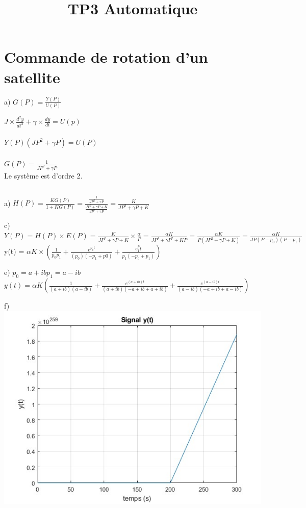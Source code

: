 \documentclass[15pt]{article}
\title{TP3 Automatique}
\begin{document}
\maketitle

\begin{abstract}
\end{abstract}

\section{Commande de rotation d'un satellite}

a) $G(P) = \frac{Y(P)}{U(P)} $

$J\times \frac{d^2y}{dt^2} + \gamma \times \frac{dy}{dt} =U(p)$ 
\\
\\
$ Y(P) (JP^2 + \gamma P) = U(P)$
\\
\\
$G(P) = \frac{1}{JP^2 + \gamma P}$ \\

Le système est d'ordre 2. 



\subsection{}
a) 
$H(P) = \frac{KG(P)}{1+KG(P)} = \frac{\frac{1}{JP^2 + \gamma P}}{\frac{JP^2 + \gamma P + K}{JP^2 + \gamma P}} = \frac{K}{JP^2+\gamma P + K}$

c) 
$Y(P) = H(P) \times E(P) = \frac{K}{JP^2+\gamma P + K} \times \frac{\alpha}{P} = \frac{\alpha K }{ JP^3 + \gamma P^2 + KP} = \frac{\alpha K}{P(JP^2 + \gamma P + K)} = \frac{\alpha K }{JP(P-p_0)(P-p_1)}$
y(t) = $\alpha K \times (\frac{1}{p_0p_1} + \frac{e^{p_0t}}{(p_0)(-p_1+p0)} + \frac{e^p_1t}{p_1(-p_0 + p_1)})$

e) 
$p_0 = a+ib p_1 = a-ib$
$ 
y(t) = \alpha K \left( \frac{1}{(a+ib)(a-ib)} + \frac{e^{(a+ib)t}}{(a+ib)(-a+ib+a+ib)} + \frac{e^{(a-ib)t}}{(a-ib)(-a+ib+a-ib)} \right) $

f) \
\includegraphics{untitled.jpg}
\end{document}
